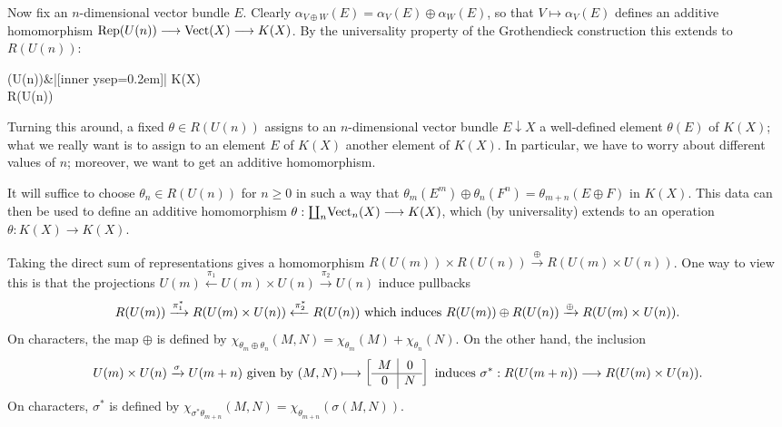 Now fix an $n$-dimensional vector bundle $E$. Clearly $\alpha_{V \oplus W}(E) = \alpha_V(E) \oplus \alpha_W(E)$, so that $V \mapsto \alpha_V(E)$ defines an additive homomorphism $\Rep(U(n)) \to \Vect(X) \to K(X)$. By the universality property of the Grothendieck construction this extends to $R (U(n))$:
\begin{ctikzcd}
\Rep(U(n))\dar\rar["\alpha_-(E)"] &|[inner ysep=0.2em]| K(X)\\
R(U(n))\urar["\theta\mapsto\theta(E)"{sloped, anchor=north}]
\end{ctikzcd}

Turning this around, a fixed $\theta \in R (U(n))$ assigns to an $n$-dimensional vector bundle $E \downarrow X$ a well-defined element $\theta(E)$ of $K(X)$; what we really want is to assign to an element $E$ of $K(X)$ another element of $K(X)$.  In particular, we have to worry about different values of $n$; moreover, we want to get an additive homomorphism.

It will suffice to choose $\theta_n \in R(U(n))$ for $n \ge 0$ in such a way that $\theta_m (E^m) \oplus \theta_n (F^n) = \theta_{m+n}(E \oplus F)$ in $K(X)$. This data can then be used to define an additive homomorphism $\theta:\coprod_n\! \Vect_n(X) \to K(X)$, which (by universality) extends to an operation $\theta:K(X)\to K(X)$.

Taking the direct sum of representations gives a homomorphism $R(U(m)) \times R(U(n)) \xrightarrow{\oplus} R(U(m) \times U(n))$. One way to view this is that the projections $U(m) \xleftarrow{\pi_1} U(m) \times U(n) \xrightarrow{\pi_2} U(n)$ induce pullbacks
\[R(U(m))\xrightarrow{\pi_1^*}R(U(m) \times U(n))\xleftarrow{\pi_2^*}R(U(n))\textup{ which induces } R(U(m)) \oplus R(U(n)) \xrightarrow{\oplus} R(U(m) \times U(n)).\]
On characters, the map $\oplus$ is defined by $\chi_{\theta_m \oplus \theta_n}(M, N) = \chi_{\theta_m}(M) + \chi_{\theta_n}(N)$.  On the other hand, the inclusion
\[U(m) \times U(n) \xrightarrow{\sigma} U(m+n)\text{ given by }(M, N) \mapsto \left[\begin{array}{c|c}M & 0 \\ \hline 0 & N\end{array}\right]
\textup{ induces }\sigma^*: R(U(m+n)) \to R(U(m) \times U(n)).\]
On characters, $\sigma^*$ is defined by $\chi_{\sigma^* \theta_{m+n}}(M, N) = \chi_{\theta_{m+n}}\left(\sigma(M,N)\right)$.

